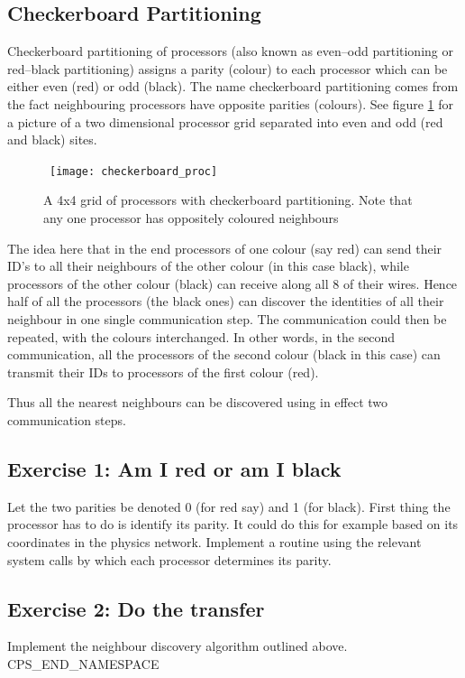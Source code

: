 \subsection{Checkerboard Partitioning}
Checkerboard partitioning of processors (also known as even--odd partitioning
or red--black partitioning) assigns a parity (colour) to each processor which
can be either even (red) or odd (black). The name checkerboard partitioning
comes from the fact neighbouring processors have opposite parities (colours).
See figure \ref{f:checkerboard_proc} for a picture of a two dimensional 
processor grid separated into even and odd (red and black) sites.
\begin{figure}[h]
\begin{center}
\leavevmode
\hbox{%
\texttt{[image: checkerboard\_proc]}
}
\end{center}
\caption{A 4x4 grid of processors with checkerboard partitioning. Note that
any one processor has oppositely coloured neighbours}
\label{f:checkerboard_proc}
\end{figure}

The idea here that in the end processors of one colour (say red) can
send their ID's to all their neighbours of the other colour (in this
case black), while processors of the other colour (black) can receive
along all 8 of their wires. Hence half of all the processors (the
black ones) can discover the identities of all their neighbour in one
single communication step. The communication could then be repeated, with
the colours interchanged. In other words, in the second communication,
all the processors of the second colour (black in this case) can transmit
their IDs to processors of the first colour (red).

Thus all the nearest neighbours can be discovered using in effect two
communication steps.

\subsection{Exercise 1: Am I red or am I black} 
Let the two parities be denoted 0 (for red say) and 1 (for black). First
thing the processor has to do is identify its parity. It could do this 
for example based on its coordinates in the physics network. Implement
a routine using the relevant system calls by which each processor determines
its parity.

\subsection{Exercise 2: Do the transfer}
Implement the neighbour discovery algorithm outlined above.
CPS_END_NAMESPACE
